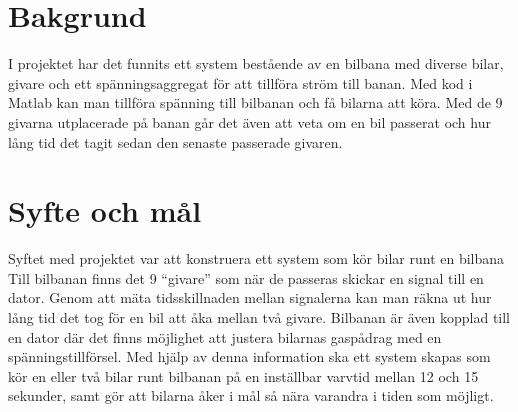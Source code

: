 \section{Bakgrund}
I projektet har det funnits ett system bestående av en bilbana med diverse bilar, givare och ett spänningsaggregat för att tillföra ström till banan. Med kod i Matlab kan man tillföra spänning till bilbanan och få bilarna att köra. Med de 9 givarna utplacerade på banan går det även att veta om en bil passerat och hur lång tid det tagit sedan den senaste passerade givaren.

\section{Syfte och mål}
Syftet med projektet var att konstruera ett system som kör bilar runt en bilbana
Till bilbanan finns det 9 ``givare'' som när
de passeras skickar en signal till en dator. Genom att mäta tidsskillnaden
mellan signalerna kan man räkna ut hur lång tid det tog för en bil att åka
mellan två givare. Bilbanan är även kopplad till en dator där det finns
möjlighet att justera bilarnas gaspådrag med en spänningstillförsel. Med hjälp
av denna information ska ett system skapas som kör en eller två bilar runt
bilbanan på en inställbar varvtid mellan 12 och 15 sekunder, samt gör att
bilarna åker i mål så nära varandra i tiden som möjligt.
